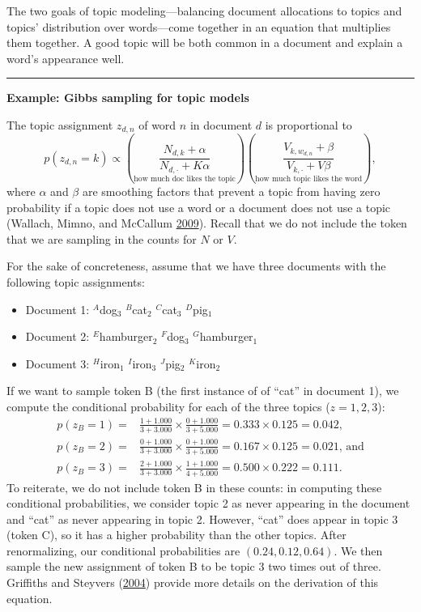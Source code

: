 \documentclass[]{krantz}
\begin{document}
The two goals of topic modeling---balancing document allocations to
topics and topics' distribution over words---come together in an
equation that multiplies them together. A good topic will be both common
in a document and explain a word's appearance well.

\begin{center}\rule{0.5\linewidth}{\linethickness}\end{center}

\textbf{Example: Gibbs sampling for topic models}

The topic assignment \(z_{d,n}\) of word \(n\) in document \(d\) is
proportional to
\[p(z_{d,n}=k) \propto \left( \underset{\text{how much doc likes the topic}}{\frac{N_{d,k} + \alpha}{N_{d, \cdot} + K \alpha}} \right) \left(\underset{\text{how much topic likes the word}}{\frac{V_{k,w_{d,n}} + \beta}{V_{k, \cdot} + V \beta}} \right),\]
where \(\alpha\) and \(\beta\) are smoothing factors that prevent a
topic from having zero probability if a topic does not use a word or a
document does not use a topic (Wallach, Mimno, and McCallum
\protect\hyperlink{ref-wallach-09b}{2009}). Recall that we do not
include the token that we are sampling in the counts for \(N\) or \(V\).

For the sake of concreteness, assume that we have three documents with
the following topic assignments:

\begin{itemize}
\item
  Document 1: \(^A\)dog\(_3\) \(^B\)cat\(_2\) \(^C\)cat\(_3\)
  \(^D\)pig\(_1\)
\item
  Document 2: \(^E\)hamburger\(_2\) \(^F\)dog\(_3\)
  \(^G\)hamburger\(_1\)
\item
  Document 3: \(^H\)iron\(_1\) \(^I\)iron\(_3\) \(^J\)pig\(_2\)
  \(^K\)iron\(_2\)
\end{itemize}

If we want to sample token B (the first instance of of ``cat'' in
document 1), we compute the conditional probability for each of the
three topics (\(z=1,2,3\)): \[\begin{aligned}
p(z_B = 1) = & \frac{1 + 1.000}{3 + 3.000} \times \frac{0
    + 1.000}{3 + 5.000} = 0.333 \times 0.125 = 0.042, \\[4pt]
p(z_B = 2) = & \frac{0 + 1.000}{3 + 3.000} \times \frac{0
    + 1.000}{3 + 5.000} = 0.167 \times 0.125 = 0.021\mbox{, and} \\[4pt]
p(z_B = 3) = & \frac{2 + 1.000}{3 + 3.000} \times \frac{1 + 1.000}{4 + 5.000} = 0.500 \times 0.222 = 0.111.\end{aligned}\]
To reiterate, we do not include token B in these counts: in computing
these conditional probabilities, we consider topic 2 as never appearing
in the document and ``cat'' as never appearing in topic 2. However,
``cat'' does appear in topic 3 (token C), so it has a higher probability
than the other topics. After renormalizing, our conditional
probabilities are \((0.24, 0.12, 0.64)\). We then sample the new
assignment of token B to be topic 3 two times out of three. Griffiths
and Steyvers (\protect\hyperlink{ref-griffiths-04}{2004}) provide more
details on the derivation of this equation.
\end{document}
